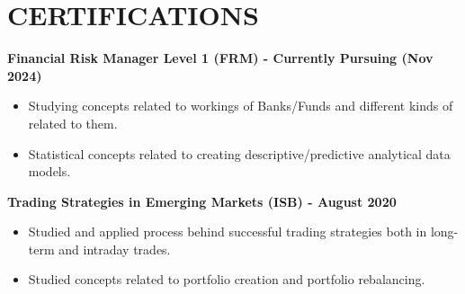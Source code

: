 \documentclass[a4paper,8pt]{article}
\begin{document}
\section{\textbf{CERTIFICATIONS}}
\vspace{2mm}
\textbf{Financial Risk Manager Level 1 (FRM) - Currently Pursuing (Nov 2024)} \\[4pt]
\begin{minipage}[t]{\linewidth}
    \begin{itemize}[nosep,after=\strut, leftmargin=1em, itemsep=2pt]
        \item Studying concepts related to workings of Banks/Funds and different kinds of related to them.
        \item Statistical concepts related to creating descriptive/predictive analytical data models.
    \end{itemize}
\end{minipage}

\textbf{Trading Strategies in Emerging Markets (ISB) - August 2020} \\[4pt]
\begin{minipage}[t]{\linewidth}
    \begin{itemize}[nosep,after=\strut, leftmargin=1em, itemsep=2pt]
        \item Studied and applied process behind successful trading strategies both in long-term and intraday trades.
        \item Studied concepts related to portfolio creation and portfolio rebalancing.
    \end{itemize}
\end{minipage}
\end{document}
